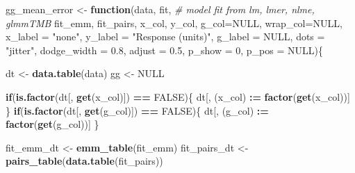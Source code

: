 \documentclass[]{book}
\newenvironment{Shaded}{\begin{snugshade}}{\end{snugshade}}
\newcommand{\CommentTok}[1]{\textcolor[rgb]{0.56,0.35,0.01}{\textit{#1}}}
\newcommand{\ControlFlowTok}[1]{\textcolor[rgb]{0.13,0.29,0.53}{\textbf{#1}}}
\newcommand{\DataTypeTok}[1]{\textcolor[rgb]{0.13,0.29,0.53}{#1}}
\newcommand{\DecValTok}[1]{\textcolor[rgb]{0.00,0.00,0.81}{#1}}
\newcommand{\ErrorTok}[1]{\textcolor[rgb]{0.64,0.00,0.00}{\textbf{#1}}}
\newcommand{\FloatTok}[1]{\textcolor[rgb]{0.00,0.00,0.81}{#1}}
\newcommand{\KeywordTok}[1]{\textcolor[rgb]{0.13,0.29,0.53}{\textbf{#1}}}
\newcommand{\NormalTok}[1]{#1}
\newcommand{\OperatorTok}[1]{\textcolor[rgb]{0.81,0.36,0.00}{\textbf{#1}}}
\newcommand{\OtherTok}[1]{\textcolor[rgb]{0.56,0.35,0.01}{#1}}
\newcommand{\StringTok}[1]{\textcolor[rgb]{0.31,0.60,0.02}{#1}}
\begin{document}
\begin{Shaded}
\begin{Highlighting}[]
\NormalTok{gg_mean_error <-}\StringTok{ }\ControlFlowTok{function}\NormalTok{(data,}
\NormalTok{                          fit, }\CommentTok{# model fit from lm, lmer, nlme, glmmTMB}
\NormalTok{                          fit_emm,}
\NormalTok{                          fit_pairs,}
\NormalTok{                          x_col,}
\NormalTok{                          y_col,}
                          \DataTypeTok{g_col=}\OtherTok{NULL}\NormalTok{,}
                          \DataTypeTok{wrap_col=}\OtherTok{NULL}\NormalTok{,}
                          \DataTypeTok{x_label =} \StringTok{"none"}\NormalTok{,}
                          \DataTypeTok{y_label =} \StringTok{"Response (units)"}\NormalTok{,}
                          \DataTypeTok{g_label =} \OtherTok{NULL}\NormalTok{,}
                          \DataTypeTok{dots =} \StringTok{"jitter"}\NormalTok{,}
                          \DataTypeTok{dodge_width =} \FloatTok{0.8}\NormalTok{,}
                          \DataTypeTok{adjust =} \FloatTok{0.5}\NormalTok{,}
                          \DataTypeTok{p_show =} \DecValTok{0}\NormalTok{,}
                          \DataTypeTok{p_pos =} \OtherTok{NULL}\NormalTok{)\{}
 

\NormalTok{  dt <-}\StringTok{ }\KeywordTok{data.table}\NormalTok{(data)}
\NormalTok{  gg <-}\StringTok{ }\OtherTok{NULL}
  
  \ControlFlowTok{if}\NormalTok{(}\KeywordTok{is.factor}\NormalTok{(dt[, }\KeywordTok{get}\NormalTok{(x_col)]) }\OperatorTok{==}\StringTok{ }\OtherTok{FALSE}\NormalTok{)\{}
\NormalTok{    dt[, (x_col) }\OperatorTok{:}\ErrorTok{=}\StringTok{ }\KeywordTok{factor}\NormalTok{(}\KeywordTok{get}\NormalTok{(x_col))]}
\NormalTok{  \}}
  \ControlFlowTok{if}\NormalTok{(}\KeywordTok{is.factor}\NormalTok{(dt[, }\KeywordTok{get}\NormalTok{(g_col)]) }\OperatorTok{==}\StringTok{ }\OtherTok{FALSE}\NormalTok{)\{}
\NormalTok{    dt[, (g_col) }\OperatorTok{:}\ErrorTok{=}\StringTok{ }\KeywordTok{factor}\NormalTok{(}\KeywordTok{get}\NormalTok{(g_col))]}
\NormalTok{  \}}

\NormalTok{  fit_emm_dt <-}\StringTok{ }\KeywordTok{emm_table}\NormalTok{(fit_emm)}
\NormalTok{  fit_pairs_dt <-}\StringTok{ }\KeywordTok{pairs_table}\NormalTok{(}\KeywordTok{data.table}\NormalTok{(fit_pairs))}


\end{Highlighting}
\end{Shaded}
\end{document}
